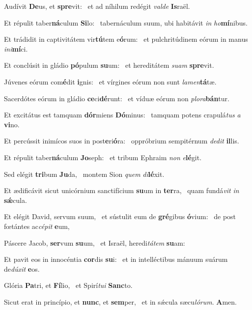 \item Audívit \textbf{De}us, et \textbf{spre}vit:~\psstar{} et ad níhilum redégit \textit{valde} \textbf{Is}raël.

\item Et répulit taber\textbf{ná}culum \textbf{Si}lo:~\psstar{} tabernáculum suum, ubi habitávit \textit{in} \textit{ho}\textbf{mí}nibus.

\item Et trádidit in captivitátem vir\textbf{tú}tem e\textbf{ó}rum:~\psstar{} et pulchritúdinem eórum in manus \textit{ini}\textbf{mí}ci.

\item Et conclúsit in gládio \textbf{pó}pulum \textbf{su}um:~\psstar{} et hereditátem \textit{suam} \textbf{spre}vit.

\item Júvenes eórum com\textbf{é}dit \textbf{i}gnis:~\psstar{} et vírgines eórum non sunt \textit{lamen}\textbf{tá}tæ.

\item Sacerdótes eórum in gládio \textbf{ce}ci\textbf{dé}runt:~\psstar{} et víduæ eórum non \textit{plora}\textbf{bán}tur.

\item Et excitátus est tamquam \textbf{dór}miens \textbf{Dó}minus:~\psstar{} tamquam potens crapulá\textit{tus} \textit{a} \textbf{vi}no.

\item Et percússit inimícos suos in post\textbf{e}ri\textbf{ó}ra:~\psstar{} oppróbrium sempitérnum \textit{dedit} \textbf{il}lis.

\item Et répulit taber\textbf{ná}culum \textbf{Jo}seph:~\psstar{} et tribum Ephraim \textit{non} \textit{e}\textbf{lé}git.

\item Sed elégit \textbf{tri}bum \textbf{Ju}da,~\psstar{} montem Sion \textit{quem} \textit{di}\textbf{lé}xit.

\item Et ædificávit sicut unicórnium sanctifícium \textbf{su}um in \textbf{ter}ra,~\psstar{} quam fundá\textit{vit} \textit{in} \textbf{sǽ}cula.

\item Et elégit David, servum suum,~\pscross{} et sústulit eum de \textbf{gré}gibus \textbf{ó}vium:~\psstar{} de post fœtántes ac\textit{cépit} \textbf{e}um,

\item Páscere Jacob, \textbf{ser}vum \textbf{su}um,~\psstar{} et Israël, heredi\textit{tátem} \textbf{su}am:

\item Et pavit eos in innocéntia \textbf{cor}dis \textbf{su}i:~\psstar{} et in intelléctibus mánuum suárum de\textit{dúxit} \textbf{e}os.

\item Glória \textbf{Pa}tri, et \textbf{Fí}lio,~\psstar{} et Spirí\textit{tui} \textbf{Sanc}to.

\item Sicut erat in princípio, et \textbf{nunc}, et \textbf{sem}per,~\psstar{} et in sǽcula sæcu\textit{lórum}. \textbf{A}men.